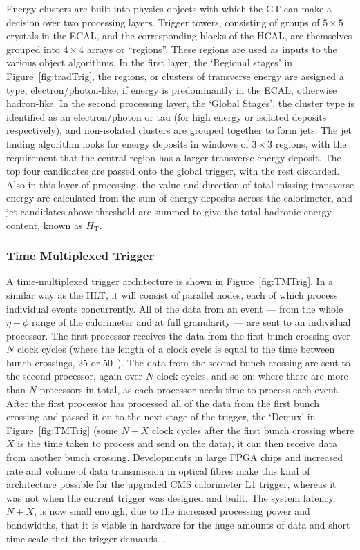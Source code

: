 Energy clusters are built into physics objects with which the \ac{GT} can make a decision over two processing layers. 
Trigger towers, consisting of groups of $5 \times 5$ crystals in the \ac{ECAL}, and the corresponding blocks of the \ac{HCAL}, are themselves grouped into $4 \times 4$ arrays or ``regions''. 
These regions are used as inputs to the various object algorithms.
In the first layer, the `Regional stages' in Figure~\ref{fig:tradTrig}, the regions, or clusters of transverse energy are assigned a type; electron/photon-like, if energy is predominantly in the \ac{ECAL}, otherwise hadron-like.
In the second processing layer, the `Global Stages', the cluster type is identified as an electron/photon or tau (for high energy or isolated deposits respectively), and non-isolated clusters are grouped together to form jets.
The jet finding algorithm looks for energy deposits in windows of $3 \times 3$ regions, with the requirement that the central region has a larger transverse energy deposit. 
The top four candidates are passed onto the global trigger, with the rest discarded.
Also in this layer of processing, the value and direction of total missing transverse energy are calculated from the sum of energy deposits across the calorimeter, 
and jet candidates above threshold are summed to give the total hadronic energy content, known as $H_{\mathrm{T}}$.    




\subsubsection{Time Multiplexed Trigger}
A time-multiplexed trigger architecture is shown in Figure~\ref{fig:TMTrig}. 
In a similar way as the \ac{HLT}, it will consist of parallel nodes, each of which process individual events concurrently.
All of the data from an event --- from the whole $\eta - \phi$ range of the calorimeter and at full granularity --- are sent to an individual processor. 
The first processor receives the data from the first bunch crossing over $N$ clock cycles (where the length of a clock cycle is equal to the time between bunch crossings, 25 or 50~\ns).
The data from the second bunch crossing are sent to the second processor, again over $N$ clock cycles, and so on; where there are more than $N$ processors in total, as each processor needs time to process each event.
After the first processor has processed all of the data from the first bunch crossing and passed it on to the next stage of the trigger, the `Demux' in Figure~\ref{fig:TMTrig} (some $N+X$ clock cycles after the first bunch crossing where $X$ is the time taken to process and send on the data), it can then receive data from another bunch crossing.
Developments in large \ac{FPGA} chips and increased rate and volume of data transmission in optical fibres make this kind of architecture possible for the upgraded CMS calorimeter L1 trigger, whereas it was not when the current trigger was designed and built. 
The system latency, $N+X$, is now small enough, due to the increased processing power and bandwidths, that it is viable in hardware for the huge amounts of data and short time-scale that the trigger demands~\cite{TMT_dem}. 

